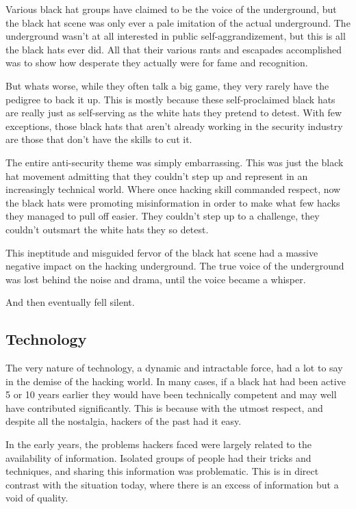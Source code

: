 \documentclass[letterpaper,12pt,english]{sphinxmanual}
\begin{document}
Various black hat groups have claimed to be the voice of the underground,
but the black hat scene was only ever a pale imitation of the actual
underground. The underground wasn't at all interested in public
self-aggrandizement, but this is all the black hats ever did. All that
their various rants and escapades accomplished was to show how desperate
they actually were for fame and recognition.

But whats worse, while they often talk a big game, they very rarely have
the pedigree to back it up. This is mostly because these self-proclaimed
black hats are really just as self-serving as the white hats they pretend
to detest. With few exceptions, those black hats that aren't already
working in the security industry are those that don't have the skills
to cut it.

The entire anti-security theme was simply embarrassing. This was just the
black hat movement admitting that they couldn't step up and represent
in an increasingly technical world. Where once hacking skill commanded
respect, now the black hats were promoting misinformation in order to
make what few hacks they managed to pull off easier. They couldn't step
up to a challenge, they couldn't outsmart the white hats they so detest.

This ineptitude and misguided fervor of the black hat scene had a
massive negative impact on the hacking underground. The true voice of
the underground was lost behind the noise and drama, until the voice
became a whisper.

And then eventually fell silent.


\subsection{Technology}
\label{underground-myth:technology}
The very nature of technology, a dynamic and intractable force, had a lot
to say in the demise of the hacking world. In many cases, if a black hat
had been active 5 or 10 years earlier they would have been technically
competent and may well have contributed significantly. This is because
with the utmost respect, and despite all the nostalgia, hackers of the
past had it easy.

In the early years, the problems hackers faced were largely related to the
availability of information. Isolated groups of people had their tricks
and techniques, and sharing this information was problematic. This is
in direct contrast with the situation today, where there is an excess
of information but a void of quality.
\end{document}
